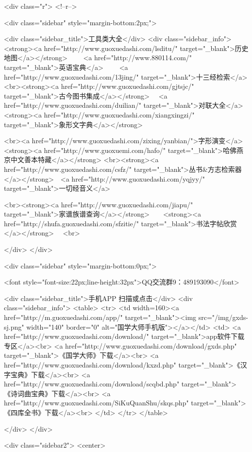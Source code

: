 <div class="r">   <!--r-->



<div class="sidebar"  style="margin-bottom:2px;">

 
<div class="sidebar_title">工具类大全</div>
<div class="sidebar_info">
<strong><a href="http://www.guoxuedashi.com/lsditu/" target="_blank">历史地图</a></strong>　　
<a href="http://www.880114.com/" target="_blank">英语宝典</a>　　
<a href="http://www.guoxuedashi.com/13jing/" target="_blank">十三经检索</a>　
<br><strong><a href="http://www.guoxuedashi.com/gjtsjc/" target="_blank">古今图书集成</a></strong>　
<a href="http://www.guoxuedashi.com/duilian/" target="_blank">对联大全</a>　<strong><a href="http://www.guoxuedashi.com/xiangxingzi/" target="_blank">象形文字典</a></strong>　

<br><a href="http://www.guoxuedashi.com/zixing/yanbian/">字形演变</a>　　<strong><a href="http://www.guoxuemi.com/hafo/" target="_blank">哈佛燕京中文善本特藏</a></strong>
<br><strong><a href="http://www.guoxuedashi.com/csfz/" target="_blank">丛书&方志检索器</a></strong>　<a href="http://www.guoxuedashi.com/yqjyy/" target="_blank">一切经音义</a>　　

<br><strong><a href="http://www.guoxuedashi.com/jiapu/" target="_blank">家谱族谱查询</a></strong>　　<strong><a href="http://shufa.guoxuedashi.com/sfzitie/" target="_blank">书法字帖欣赏</a></strong>　
<br>

</div>
</div>


<div class="sidebar" style="margin-bottom:0px;">

<font style="font-size:22px;line-height:32px">QQ交流群9：489193090</font>


<div class="sidebar_title">手机APP 扫描或点击</div>
<div class="sidebar_info">
<table>
<tr>
	<td width=160><a href="http://m.guoxuedashi.com/app/" target="_blank"><img src="/img/gxds-sj.png" width="140"  border="0" alt="国学大师手机版"></a></td>
	<td>
<a href="http://www.guoxuedashi.com/download/" target="_blank">app软件下载专区</a><br>
<a href="http://www.guoxuedashi.com/download/gxds.php" target="_blank">《国学大师》下载</a><br>
<a href="http://www.guoxuedashi.com/download/kxzd.php" target="_blank">《汉字宝典》下载</a><br>
<a href="http://www.guoxuedashi.com/download/scqbd.php" target="_blank">《诗词曲宝典》下载</a><br>
<a href="http://www.guoxuedashi.com/SiKuQuanShu/skqs.php" target="_blank">《四库全书》下载</a><br>
</td>
</tr>
</table>

</div>
</div>


<div class="sidebar2">
<center>


